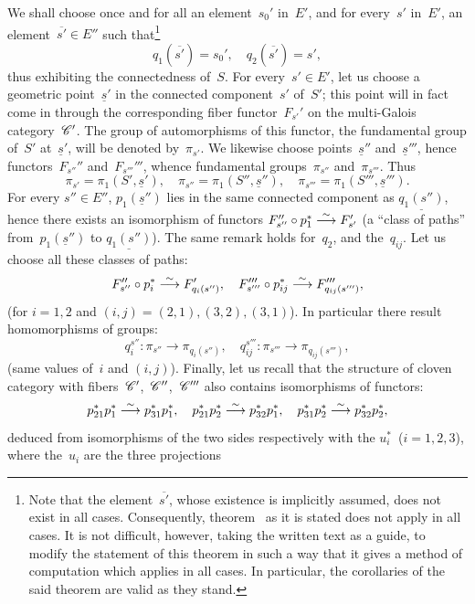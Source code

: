 We shall choose once and for all an element~$s_0'$ in~$E'$, and for
every~$s'$ in~$E'$, an element~$\overline{s'}\in E''$ such
that\footnote{Note that the element~$\overline{s'}$, whose existence
is implicitly assumed, does not exist in all cases. Consequently,
theorem~ as it is stated does not apply in all cases. It
is not difficult, however, taking the written text as a guide, to
modify the statement of this theorem in such a way that it gives a
method of computation which applies in all cases. In particular, the
corollaries of the said theorem are valid as they stand.}
$$
q_1(\overline{s'})=s_0', \quad q_2(\overline{s'})=s',
$$
thus exhibiting the connectedness of~$S$. For every~$s'\in E'$, let
us choose a geometric point~$\underline{s}'$ in the connected
component~$s'$ of~$S'$; this point will in fact come in through the
corresponding fiber functor~$F_{s'}'$ on the multi-Galois
category~$\cal{C}'$. The group of automorphisms of this functor, \ie
the fundamental group of~$S'$ at~$\underline{s}'$, will be denoted
by~$\pi_{s'}$. We likewise choose points~$\underline{s}''$
and~$\underline{s}'''$, hence functors~$F_{s''}''$
and~$F_{s'''}'''$, whence fundamental groups~$\pi_{s''}$
and~$\pi_{s'''}$. Thus
$$
\pi_{s'}=\pi_1(S',\underline{s}'), \quad
\pi_{s''}=\pi_1(S'',\underline{s}''), \quad
\pi_{s'''}=\pi_1(S''',\underline{s}''').
$$
For every $s''\in E''$, $p_1(\underline{s}'')$ lies in the same
connected component as $\underline{q_1(s'')}$, hence there exists an
isomorphism of functors
$F''_{s''}\circ p_1^*\overset{\sim}{\longrightarrow} F'_{s'}$
(\ie a ``class of paths'' from~$p_1(\underline{s}'')$ to
$\underline{q_1(s'')}$). The same remark holds for~$q_2$, and
the~$q_{ij}$. Let us choose all these classes of paths:
$$
F''_{s''}\circ p_i^*\overset{\sim}{\longrightarrow} F'_{q_i(s'')},\quad F_{s'''}'''\circ
p_{ij}^*\overset{\sim}{\longrightarrow} F'''_{q_{ij}(s''')},
$$
(for
$i=1,2$ and $(i,j)=(2,1),(3,2),(3,1)$). In particular there result
homomorphisms of groups:
\begin{equation*}
\label{eq:IX.5.2}
\tag{2} {q_i^{s''}\colon \pi_{s''}\to\pi_{q_i(s'')},\quad
q_{ij}^{s'''}\colon \pi_{s'''}\to\pi_{q_{ij}(s''')},}
\end{equation*}
(same values of~$i$ and $(i,j)$). Finally, let us recall that the
structure of cloven category with fibers~$\cal{C}'$,~$\cal{C''}$,~$\cal{C'''}$
also contains isomorphisms of functors:
$$
p_{21}^*p_1^*\overset{\sim}{\longrightarrow} p_{31}^*p_1^*,\quad p_{21}^*p_2^*\overset{\sim}{\longrightarrow}
p_{32}^*p_1^*,\quad p_{31}^*p_2^*\overset{\sim}{\longrightarrow} p_{32}^*p_2^*,
$$
deduced from isomorphisms of the two sides respectively with the
$u_i^*$~($i=1,2,3$), where the~$u_i$ are the three projections
